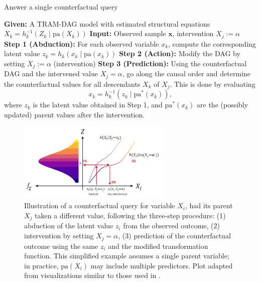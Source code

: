 \begin{algorithm}[!ht]
\caption{Answer a single counterfactual query}
\label{alg:single_cf}
\begin{algorithmic}
\State \textbf{Given:} A TRAM-DAG model with estimated structural equations $X_k = h_k^{-1}(Z_k \mid \text{pa}(X_k))$
\State \textbf{Input:} Observed sample $\mathbf{x}$, intervention $X_j := \alpha$
\vspace{0.3em}
\State \textbf{Step 1 (Abduction):} For each observed variable $x_k$, compute the corresponding latent value $z_k = h_k(x_k \mid \text{pa}(x_k))$
\vspace{0.3em}
\State \textbf{Step 2 (Action):} Modify the DAG by setting $X_j := \alpha$ (intervention)
\vspace{0.3em}
\State \textbf{Step 3 (Prediction):} Using the counterfactual DAG and the intervened value $X_j = \alpha$, go along the causal order and determine the counterfactual values for all descendants $X_k$ of $X_j$. This is done by evaluating
\[
x_k = h_k^{-1}(z_k \mid \text{pa}^*(x_k)),
\]
where $z_k$ is the latent value obtained in Step 1, and $\text{pa}^*(x_k)$ are the (possibly updated) parent values after the intervention.
\end{algorithmic}
\end{algorithm}

\begin{figure}[!ht]
\centering
\includegraphics[width=0.65\textwidth]{img/counterfactuals.png}
\caption{Illustration of a counterfactual query for variable $X_i$, had its parent $X_j$ taken a different value, following the three-step procedure: (1) abduction of the latent value $z_i$ from the observed outcome, (2) intervention by setting $X_j = \alpha$, (3) prediction of the counterfactual outcome using the same $z_i$ and the modified transformation function. This simplified example assumes a single parent variable; in practice, $\text{pa}(X_i)$ may include multiple predictors. Plot adapted from visualizations similar to those used in \citet{sick2025}.}
\label{fig:cf_viz}
\end{figure}



